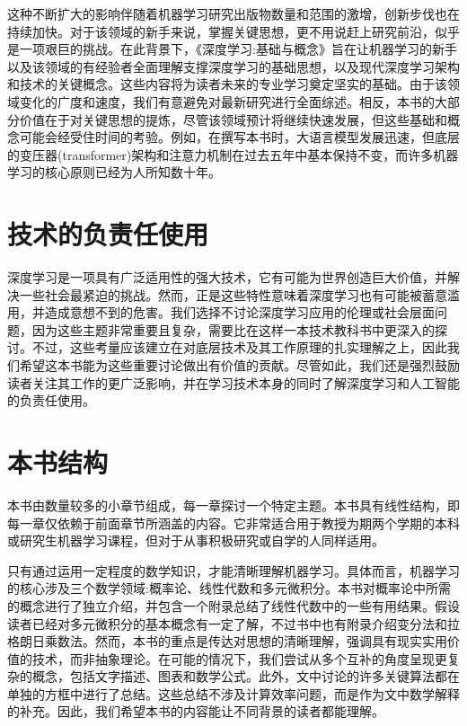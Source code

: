 \documentclass[10pt]{article}
\begin{document}
这种不断扩大的影响伴随着机器学习研究出版物数量和范围的激增，创新步伐也在持续加快。对于该领域的新手来说，掌握关键思想，更不用说赶上研究前沿，似乎是一项艰巨的挑战。在此背景下，《深度学习:基础与概念》旨在让机器学习的新手以及该领域的有经验者全面理解支撑深度学习的基础思想，以及现代深度学习架构和技术的关键概念。这些内容将为读者未来的专业学习奠定坚实的基础。由于该领域变化的广度和速度，我们有意避免对最新研究进行全面综述。相反，本书的大部分价值在于对关键思想的提炼，尽管该领域预计将继续快速发展，但这些基础和概念可能会经受住时间的考验。例如，在撰写本书时，大语言模型发展迅速，但底层的变压器(transformer)架构和注意力机制在过去五年中基本保持不变，而许多机器学习的核心原则已经为人所知数十年。

\section*{技术的负责任使用}

深度学习是一项具有广泛适用性的强大技术，它有可能为世界创造巨大价值，并解决一些社会最紧迫的挑战。然而，正是这些特性意味着深度学习也有可能被蓄意滥用，并造成意想不到的危害。我们选择不讨论深度学习应用的伦理或社会层面问题，因为这些主题非常重要且复杂，需要比在这样一本技术教科书中更深入的探讨。不过，这些考量应该建立在对底层技术及其工作原理的扎实理解之上，因此我们希望这本书能为这些重要讨论做出有价值的贡献。尽管如此，我们还是强烈鼓励读者关注其工作的更广泛影响，并在学习技术本身的同时了解深度学习和人工智能的负责任使用。

\section*{本书结构}

本书由数量较多的小章节组成，每一章探讨一个特定主题。本书具有线性结构，即每一章仅依赖于前面章节所涵盖的内容。它非常适合用于教授为期两个学期的本科或研究生机器学习课程，但对于从事积极研究或自学的人同样适用。

只有通过运用一定程度的数学知识，才能清晰理解机器学习。具体而言，机器学习的核心涉及三个数学领域:概率论、线性代数和多元微积分。本书对概率论中所需的概念进行了独立介绍，并包含一个附录总结了线性代数中的一些有用结果。假设读者已经对多元微积分的基本概念有一定了解，不过书中也有附录介绍变分法和拉格朗日乘数法。然而，本书的重点是传达对思想的清晰理解，强调具有现实实用价值的技术，而非抽象理论。在可能的情况下，我们尝试从多个互补的角度呈现更复杂的概念，包括文字描述、图表和数学公式。此外，文中讨论的许多关键算法都在单独的方框中进行了总结。这些总结不涉及计算效率问题，而是作为文中数学解释的补充。因此，我们希望本书的内容能让不同背景的读者都能理解。
\end{document}

